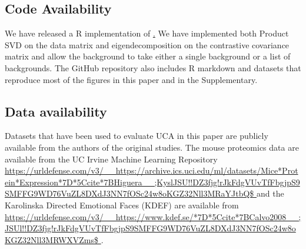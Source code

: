 \documentclass[12pt]{article}
\begin{document}
\subsection{Code Availability}
We have released a R implementation of \href{https://urldefense.com/v3/__https://github.com/rtud2/Residual-Dimension-Reduction*7D*7Bhttps:/*github.com/rtud2/Residual-Dimension-Reduction__;JSUv!!DZ3fjg!rJkFdgVUvTfFbgjpS9SMFFG9WD76VuZL8DXdJ3NN7fOSc24w8oKGZ32Nll3Mo-dvm3k$ }. We have implemented both Product SVD on the data matrix and eigendecomposition on the contrastive covariance matrix and allow the background to take either a single background or a list of backgrounds. The GitHub repository also includes R markdown and datasets that reproduce most of the figures in this paper and in the Supplementary.

\subsection{Data availability}
Datasets that have been used to evaluate UCA in this paper are publicly available from the authors of the original studies. The mouse proteomics data are available from the UC Irvine Machine Learning Repository \url{https://urldefense.com/v3/__https://archive.ics.uci.edu/ml/datasets/Mice*Protein*Expression*7D*5Ccite*7BHiguera__;KyslJSU!!DZ3fjg!rJkFdgVUvTfFbgjpS9SMFFG9WD76VuZL8DXdJ3NN7fOSc24w8oKGZ32Nll3MRaYJtbQ$ } and the Karolinska Directed Emotional Faces (KDEF) are available from \url{https://urldefense.com/v3/__https://www.kdef.se/*7D*5Ccite*7BCalvo2008__;JSUl!!DZ3fjg!rJkFdgVUvTfFbgjpS9SMFFG9WD76VuZL8DXdJ3NN7fOSc24w8oKGZ32Nll3MRWXVZms$ }.







\end{document}
